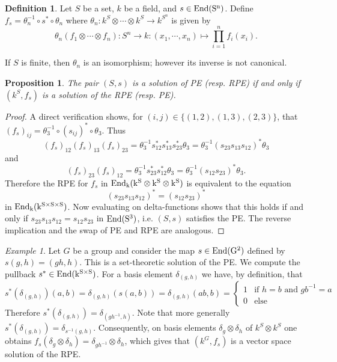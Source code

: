 \documentclass[a4paper,10pt]{amsart}
\newtheorem{proposition}[lemma]{Proposition}
\theoremstyle{definition}
\newtheorem{definition}[lemma]{Definition}
\theoremstyle{remark}
\newtheorem{example}[lemma]{Example}
\newcommand\End{\rm End}
\newcommand\ot{\otimes}
\begin{document}
\begin{definition}\label{definition fs}
Let $S$ be a set, $k$ be a field, and $s\in \End(S^n)$. Define $f_s = \theta_n^{-1}\circ s^*\circ \theta_n$ where $\theta_n: k^S \ot \cdots \ot k^S \rightarrow k^{S^n}$ is given by 
$$
     \theta_n(f_1\ot\cdots\ot f_n): S^n \longrightarrow k: (x_1,\cdots,x_n) \longmapsto \prod_{i=1}^n f_i(x_i).
$$
\end{definition}

If $S$ is finite, then $\theta_n$ is an isomorphism; however its inverse is not canonical. 

\begin{proposition}\label{dual in set }
The pair $(S,s)$ is a solution of PE (resp. RPE) if and only if $(k^S, f_s)$ is a solution of the RPE (resp. PE).
\end{proposition}
\begin{proof}
    A direct verification shows, for $(i,j)\in\{(1,2),(1,3),(2,3)\}$, that $(f_s)_{ij} = \theta_3^{-1}\circ(s_{ij})^*\circ\theta_3$. Thus
    $$(f_s)_{12}(f_s)_{13}(f_s)_{23}=\theta_3^{-1}s_{12}^*s_{13}^*s_{23}^*\theta_3=\theta_3^{-1}(s_{23}s_{13}s_{12})^*\theta_3$$
    and
    $$(f_s)_{23}(f_s)_{12} = \theta_3^{-1}s_{23}^*s_{12}^*\theta_3= \theta_3^{-1}(s_{12}s_{23})^*\theta_3.$$
    Therefore the RPE for $f_s$ in $\End_k(k^S\ot k^S \ot k^S)$ is equivalent to the equation 
    $$(s_{23}s_{13}s_{12})^* = (s_{12}s_{23})^*$$ in $\End_k(k^{S\times S \times S})$. Now evaluating on delta-functions shows that this holds if and only if $s_{23}s_{13}s_{12} = s_{12}s_{23}$ in $\End(S^3)$, i.e. $(S,s)$ satisfies the PE. The reverse implication and the swap of PE and RPE are analogous.
\end{proof}

\begin{example}\label{dual PE group solution}
    Let $G$ be a group and consider the map $s \in \End(G^2)$ defined by $s(g,h)= (gh,h)$. This is a set-theoretic solution of the PE. We compute the pullback $s^* \in \End(k^{S\times S})$. For a basis element $\delta_{(g,h)}$ we have, by definition, that 
    $$s^*(\delta_{(g,h)}) (a,b) = \delta_{(g,h)}(s(a,b)) = \delta_{(g,h)}(ab,b) = \left\lbrace \begin{array}{ll}
        1 & \text{if } h = b \text{ and } gb^{-1}=a\\
        0 & \text{else} 
    \end{array} \right.$$
Therefore $s^*(\delta_{(g,h)})= \delta_{(gh^{-1},h)}$. Note that more generally $s^*(\delta_{(g,h)})=\delta_{s^{-1}(g,h)}$. 
Consequently, on basis elements $\delta_g\ot \delta_h$ of $k^S \ot k^S$ one obtains $f_s(\delta_g\ot \delta_h) = \delta_{gh^{-1}}\ot\delta_h$, which gives that $(k^G, f_s)$ is a vector space solution of the RPE.
\end{example}
\end{document}

